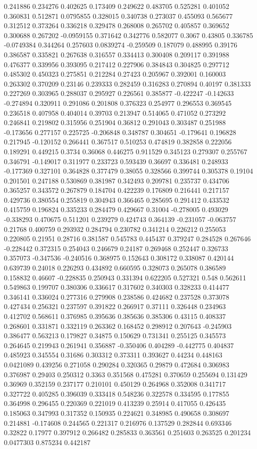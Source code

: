 0.241886 0.234276 0.402625 0.173409 0.249622 0.483705 0.525281 0.401052 0.360831 0.512871 0.0795855 0.328015 0.340738 0.273037 0.455093 0.565677 0.312512 0.373264 0.336218 0.329478 0.268008 0.265702 0.405857 0.369652 0.300688 0.267202 -0.0959155 0.371642 0.342776 0.582077 0.3067 0.43805 0.336785 -0.0749384 0.344264 0.257603 0.0839274 -0.259509 0.187079 0.488995 0.39176 0.386587 0.335821 0.267638 0.316557 0.334413 0.300408 0.209117 0.391988 0.476377 0.339956 0.393095 0.217412 0.227906 0.384843 0.304825 0.297712 0.485302 0.450323 0.275851 0.212284 0.27423 0.205967 0.392001 0.160003 0.263302 0.370209 0.23146 0.239333 0.282459 0.316283 0.270894 0.40197 0.381333 0.227269 0.303965 0.288037 0.295927 0.226561 0.385877 -0.422247 -0.142633 -0.274894 0.320911 0.291086 0.201808 0.376323 0.254977 0.296553 0.369545 0.236518 0.407958 0.404014 0.39703 0.213947 0.514065 0.471052 0.273292 0.246841 0.219802 0.315956 0.251904 0.36812 0.291043 0.303487 0.251988 -0.173656 0.277157 0.225725 -0.206848 0.348787 0.304651 -0.179641 0.196828 0.217945 -0.120152 0.266441 0.367517 0.510253 0.474819 0.382858 0.222056 0.189291 0.449215 0.3734 0.36068 0.446275 0.911529 0.345123 0.279307 0.255767 0.346791 -0.149017 0.311977 0.233723 0.593439 0.36697 0.336481 0.248933 -0.177369 0.327101 0.364828 0.377479 0.38055 0.328566 0.399744 0.305378 0.19104 0.201501 0.247188 0.530869 0.381987 0.342493 0.209781 0.235737 0.434706 0.365257 0.343572 0.267879 0.184704 0.422239 0.176809 0.216441 0.217157 0.429736 0.380554 0.255819 0.304943 0.366465 0.285695 0.291412 0.433532 0.415759 0.196824 0.335233 0.284479 0.429667 0.31004 -0.278005 0.493029 -0.338293 0.470675 0.511201 0.239279 0.424743 0.364139 -0.231057 -0.063757 0.21768 0.400759 0.293932 0.284794 0.230782 0.341214 0.226212 0.255053 0.220805 0.21951 0.28716 0.381587 0.545783 0.445437 0.379247 0.284528 0.267646 -0.228442 0.372315 0.254043 0.246679 0.24187 0.269468 0.252447 0.326733 0.357073 -0.347536 -0.240516 0.368975 0.152643 0.308172 0.338087 0.420144 0.639739 0.24018 0.226293 0.434892 0.660595 0.328073 0.265078 0.386589 0.158832 0.46607 -0.228835 0.250943 0.331394 0.622205 0.527321 0.548 0.562611 0.549863 0.199707 0.380306 0.336617 0.317602 0.340303 0.328233 0.414477 0.346141 0.336024 0.277316 0.279908 0.238586 0.424682 0.237528 0.373078 0.427434 0.256321 0.237597 0.391822 0.266917 0.37111 0.326448 0.234963 0.412702 0.568611 0.376985 0.395636 0.385636 0.385306 0.43115 0.408337 0.268601 0.331871 0.332119 0.263362 0.168452 0.298912 0.207643 -0.245903 0.386477 0.563213 0.179827 0.34875 0.150629 0.731341 0.255125 0.345573 0.264645 0.219943 0.261941 0.356887 -0.350406 0.404289 -0.442775 0.404837 0.485923 0.345554 0.31686 0.303312 0.373311 0.393627 0.44234 0.448163 0.0421089 0.439256 0.271058 0.290284 0.320365 0.29879 0.472684 0.306983 0.376987 0.29403 0.250312 0.3363 0.351568 0.475281 0.370659 0.255694 0.131429 0.36969 0.352159 0.237177 0.210101 0.450129 0.264968 0.352008 0.341717 0.327722 0.405285 0.396039 0.333418 0.548236 0.322578 0.334595 0.177855 0.364998 0.296455 0.220369 0.221019 0.413239 0.25914 0.417055 0.426435 0.185063 0.347993 0.317352 0.150935 0.224621 0.348985 0.490658 0.308697 0.214881 -0.174608 0.244565 0.221317 0.216976 0.137529 0.282844 0.693346 0.32822 0.17977 0.397912 0.266482 0.285833 0.363561 0.251603 0.263525 0.201234 0.0477303 0.875234 0.442187 